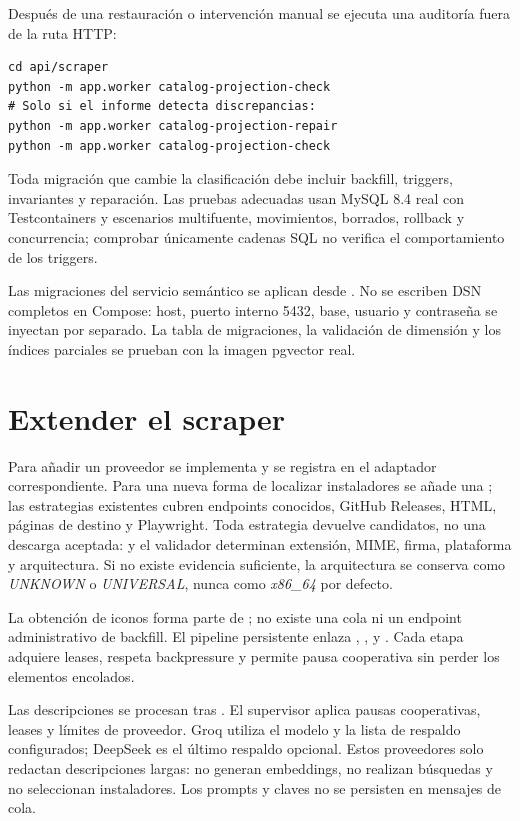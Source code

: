 Después de una restauración o intervención manual se ejecuta una auditoría fuera de la ruta HTTP:

\begin{verbatim}
cd api/scraper
python -m app.worker catalog-projection-check
# Solo si el informe detecta discrepancias:
python -m app.worker catalog-projection-repair
python -m app.worker catalog-projection-check
\end{verbatim}

Toda migración que cambie la clasificación debe incluir backfill, triggers, invariantes y reparación. Las pruebas adecuadas usan MySQL 8.4 real con Testcontainers y escenarios multifuente, movimientos, borrados, rollback y concurrencia; comprobar únicamente cadenas SQL no verifica el comportamiento de los triggers.

Las migraciones del servicio semántico se aplican desde . No se escriben DSN completos en Compose: host, puerto interno 5432, base, usuario y contraseña se inyectan por separado. La tabla de migraciones, la validación de dimensión y los índices parciales se prueban con la imagen pgvector real.

\section{Extender el scraper}

Para añadir un proveedor se implementa  y se registra en el adaptador correspondiente. Para una nueva forma de localizar instaladores se añade una ; las estrategias existentes cubren endpoints conocidos, GitHub Releases, HTML, páginas de destino y Playwright. Toda estrategia devuelve candidatos, no una descarga aceptada:  y el validador determinan extensión, MIME, firma, plataforma y arquitectura. Si no existe evidencia suficiente, la arquitectura se conserva como \emph{UNKNOWN} o \emph{UNIVERSAL}, nunca como \emph{x86\_64} por defecto.

La obtención de iconos forma parte de ; no existe una cola  ni un endpoint administrativo de backfill. El pipeline persistente enlaza , ,  y . Cada etapa adquiere leases, respeta backpressure y permite pausa cooperativa sin perder los elementos encolados.

Las descripciones se procesan tras . El supervisor aplica pausas cooperativas, leases y límites de proveedor. Groq utiliza el modelo y la lista de respaldo configurados; DeepSeek es el último respaldo opcional. Estos proveedores solo redactan descripciones largas: no generan embeddings, no realizan búsquedas y no seleccionan instaladores. Los prompts y claves no se persisten en mensajes de cola.

